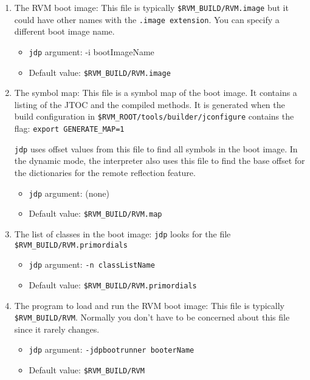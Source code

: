 \begin{enumerate}
\item The RVM boot image:
   This file is typically {\tt \$RVM\_BUILD/RVM.image} but it could
   have other names with the {\tt .image extension}.  You can specify a
   different boot image name.
\begin{itemize}
\item    {\tt jdp} argument:    {-i bootImageName}
\item   Default value:          {\tt \$RVM\_BUILD/RVM.image}
\end{itemize}

\item The symbol map:
   This file is a symbol map of the boot image.  It contains a listing of the 
   JTOC and the compiled methods.  It is generated when the build configuration 
   in {\tt \$RVM\_ROOT/tools/builder/jconfigure} contains the flag:
        {\tt export GENERATE\_MAP=1}

   {\tt jdp} uses offset 
   values from this file to find all symbols in the boot image.
   In the dynamic mode, the interpreter also uses this file to find the base 
   offset for the dictionaries for the remote reflection feature.
\begin{itemize}
\item   {\tt jdp} argument:     (none)
\item    Default value: {\tt \$RVM\_BUILD/RVM.map}
\end{itemize}

\item The list of classes in the boot image:
   {\tt jdp} looks for the file {\tt \$RVM\_BUILD/RVM.primordials}

\begin{itemize}
\item   {\tt jdp} argument:     {\tt -n classListName}
\item   Default value:  {\tt \$RVM\_BUILD/RVM.primordials}
\end{itemize}

\item The program to load and run the RVM boot image:
   This file is typically {\tt \$RVM\_BUILD/RVM}.
   Normally you don't have to be concerned about this file since it rarely
   changes.
\begin{itemize}
\item   {\tt jdp} argument:     {\tt -jdpbootrunner booterName}
\item   Default value:  {\tt \$RVM\_BUILD/RVM}
\end{itemize}
\end{enumerate}

